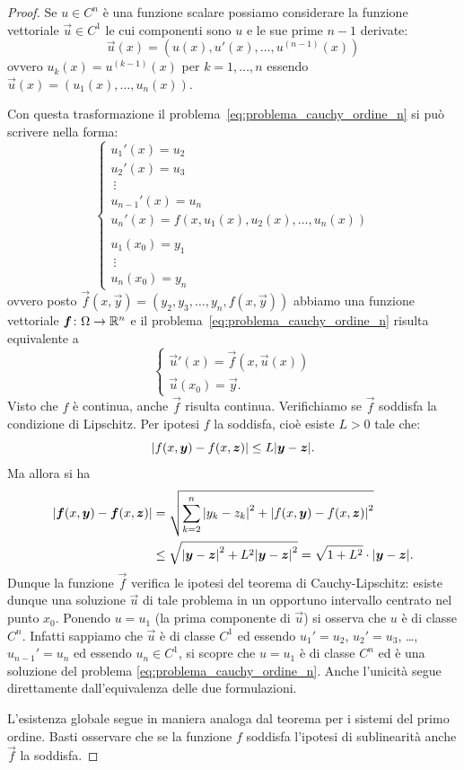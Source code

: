\begin{proof}
Se $u\in C^n$ è una funzione scalare possiamo considerare la funzione vettoriale $\vec u \in C^1$ le cui componenti sono $u$ e le sue prime $n-1$ derivate:
\[
\vec u(x) = (u(x), u'(x), \dots, u^{(n-1)}(x))
\]
ovvero $u_k(x) = u^{(k-1)}(x)$ per $k=1,\dots ,n$ essendo $\vec u(x) = (u_1(x), \dots, u_n(x))$.

Con questa trasformazione il problema~\eqref{eq:problema_cauchy_ordine_n} si può scrivere nella forma:
\[
 \begin{cases}
   u_1'(x) = u_2 \\
   u_2'(x) = u_3 \\
   \ \vdots \\
   u_{n-1}'(x) = u_n \\
   u_n'(x) = f(x, u_1(x), u_2(x), \dots, u_n(x))\\\\
   u_1(x_0) = y_1\\
   \ \vdots \\
   u_{n}(x_0) = y_n
 \end{cases}
\]
ovvero posto $\vec f(x,\vec y) = (y_2, y_3, \dots, y_n, f(x, \vec y))$ abbiamo una funzione vettoriale $\boldsymbol f\colon \Omega \to \mathbb R^n$ e il problema~\eqref{eq:problema_cauchy_ordine_n} risulta equivalente a
\begin{equation}\label{eq:437583}
  \begin{cases}
   \vec u'(x) = \vec f(x,\vec u(x))\\
   \vec u(x_0) = \vec y.
  \end{cases}
\end{equation}
Visto che $f$ è continua, anche $\vec f$ risulta continua.
Verifichiamo se $\vec f$ soddisfa la condizione di Lipschitz.
Per ipotesi $f$ la soddisfa, cioè
esiste $L>0$ tale che:
\[
  {\left|f(x,\boldsymbol y)-f(x,\boldsymbol z)\right|} \le L{\left|\boldsymbol y - \boldsymbol z\right|}.
\]
Ma allora si ha
\begin{align*}
{\left|\boldsymbol f(x,\boldsymbol y) - \boldsymbol f(x,\boldsymbol z)\right|}
  &= \sqrt{\sum_{k=2}^n {\left|y_k-z_k\right|}^2 + {\left|f(x,\boldsymbol y)-f(x,\boldsymbol z)\right|}^2} \\
  &\le \sqrt{{\left|\boldsymbol y - \boldsymbol z\right|}^2 + L^2 {\left|\boldsymbol y - \boldsymbol z\right|}^2}
  = \sqrt{1+L^2}\cdot {\left|\boldsymbol y - \boldsymbol z\right|}.
\end{align*}
Dunque la funzione $\vec f$ verifica le ipotesi del teorema di Cauchy\hyp{}Lipschitz: esiste dunque una soluzione $\vec u$ di tale problema in un opportuno intervallo centrato nel punto $x_0$.
Ponendo $u=u_1$ (la prima componente di $\vec u$)
si osserva che $u$ è di classe $C^n$.
Infatti sappiamo che $\vec u$ è di classe $C^1$
ed essendo
$u_1' = u_2$,
$u_2' = u_3$, \dots,
$u_{n-1}'=u_n$
ed essendo $u_n\in C^1$,
si scopre che $u=u_1$ è di classe $C^n$
ed è una soluzione del problema \eqref{eq:problema_cauchy_ordine_n}.
Anche l'unicità segue direttamente dall'equivalenza delle due formulazioni.

L'esistenza globale segue in maniera analoga dal teorema per i sistemi del primo ordine. Basti osservare che se la funzione $f$ soddisfa l'ipotesi di sublinearità anche $\vec f$ la soddisfa.
\end{proof}

